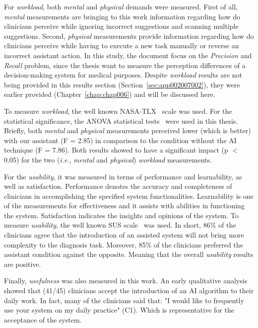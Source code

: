 For {\it workload}, both {\it mental} and {\it physical} demands were measured.
First of all, {\it mental} measurements are bringing to this work information regarding how do clinicians perceive while ignoring incorrect suggestions and scanning multiple suggestions.
Second, {\it physical} measurements provide information regarding how do clinicians perceive while having to execute a new task manually or reverse an incorrect assistant action.
In this study, the document focus on the {\it Precision} and {\it Recall} problem, since the thesis want to measure the perception differences of a decision-making system for medical purposes.
Despite {\it workload} results are not being provided in this results section (Section~\ref{sec:app002007002}), they were earlier provided (Chapter~\ref{chap:chap006}) and will be discussed here.

To measure {\it workload}, the well known \ac{NASA-TLX}~\cite{ramkumar2017using, grier2015high} scale was used.
For the statistical significance, the \ac{ANOVA} statistical tests\footnotemark[5]~\cite{Wobbrock:2011:ART:1978942.1978963, mathews2017usability} were used in this thesis.
Briefly, both {\it mental} and {\it physical} measurements perceived lower (which is better) with our assistant (F = 2.85) in comparison to the condition without the AI technique (F = 7.86).
Both results showed to have a significant impact (p $<$ 0.05) for the two ({\it i.e.}, {\it mental} and {\it physical}) {\it workload} measurements.

For the {\it usability}, it was measured in terms of performance and learnability, as well as satisfaction.
Performance denotes the accuracy and completeness of clinicians in accomplishing the specified system functionalities.
Learnability is one of the measurements for effectiveness and it assists with abilities in functioning the system.
Satisfaction indicates the insights and opinions of the system.
To measure {\it usability}, the well known \ac{SUS} scale~\cite{ramkumar2017using, grier2015high} was used.
In short, 86\% of the clinicians agree that the introduction of an assisted system will not bring more complexity to the diagnosis task.
Moreover, 85\% of the clinicians preferred the assistant condition against the opposite.
Meaning that the overall {\it usability} results are positive.

Finally, {\it usefulness} was also measured in this work.
An early qualitative analysis showed that (41/45) clinicians accept the introduction of an \ac{AI} algorithm to their daily work.
In fact, many of the clinicians said that: "I would like to frequently use your system on my daily practice" (C1).
Which is representative for the acceptance of the system.

